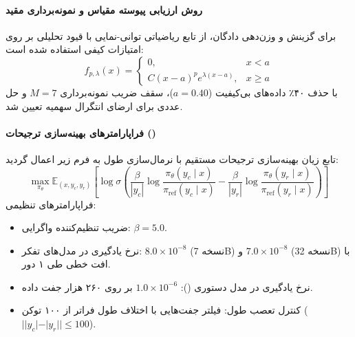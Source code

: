 \paragraph*{روش ارزیابی پیوسته مقیاس و نمونه‌برداری مقید}
برای گزینش و وزن‌دهی دادگان، از تابع ریاضیاتی توانی-نمایی با قیود تحلیلی بر روی امتیازات کیفی استفاده شده است:
\begin{equation}
    f_{p,\lambda}(x) = \begin{cases} 0, & x < a \\ C(x-a)^p e^{\lambda(x-a)}, & x \ge a \end{cases}
\end{equation}
با حذف ۴۰٪ داده‌های بی‌کیفیت ($a = 0.40$)، سقف ضریب نمونه‌برداری $M = 7$ و حل عددی برای ارضای انتگرال سهمیه تعیین شد.

\paragraph*{فراپارامترهای بهینه‌سازی ترجیحات ()}
تابع زیان بهینه‌سازی ترجیحات مستقیم با نرمال‌سازی طول به فرم زیر اعمال گردید:
\begin{equation}
    \max_{\pi_\theta} \mathbb{E}_{(x, y_c, y_r)} \left[ \log \sigma \left( \frac{\beta}{|y_c|} \log \frac{\pi_\theta(y_c \mid x)}{\pi_{\text{ref}}(y_c \mid x)} - \frac{\beta}{|y_r|} \log \frac{\pi_\theta(y_r \mid x)}{\pi_{\text{ref}}(y_r \mid x)} \right) \right]
\end{equation}
فراپارامترهای تنظیمی:
\begin{itemize}
    \item ضریب تنظیم‌کننده واگرایی: $\beta = 5.0$.
    \item نرخ یادگیری در مدل‌های تفکر: $8.0 \times 10^{-8}$ (نسخه 7B) و $7.0 \times 10^{-8}$ (نسخه 32B) با افت خطی طی ۱ دور.
    \item نرخ یادگیری در مدل دستوری (): $1.0 \times 10^{-6}$ بر روی ۲۶۰ هزار جفت داده.
    \item کنترل تعصب طول: فیلتر جفت‌هایی با اختلاف طول فراتر از ۱۰۰ توکن ($||y_c| - |y_r|| \le 100$).
\end{itemize}


